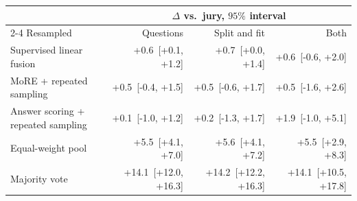 \begin{tabular}{lrrr}
\toprule
& \multicolumn{3}{c}{$\Delta$ vs.\ jury, $95\%$ interval} \\
\cmidrule(lr){2-4}
Resampled & Questions & Split and fit & Both \\
\midrule
Supervised linear fusion & +0.6~[+0.1, +1.2] & +0.7~[+0.0, +1.4] & +0.6~[-0.6, +2.0] \\
MoRE + repeated sampling & +0.5~[-0.4, +1.5] & +0.5~[-0.6, +1.7] & +0.5~[-1.6, +2.6] \\
Answer scoring + repeated sampling & +0.1~[-1.0, +1.2] & +0.2~[-1.3, +1.7] & +1.9~[-1.0, +5.1] \\
Equal-weight pool & +5.5~[+4.1, +7.0] & +5.6~[+4.1, +7.2] & +5.5~[+2.9, +8.3] \\
Majority vote & +14.1~[+12.0, +16.3] & +14.2~[+12.2, +16.3] & +14.1~[+10.5, +17.8] \\
\bottomrule
\end{tabular}
